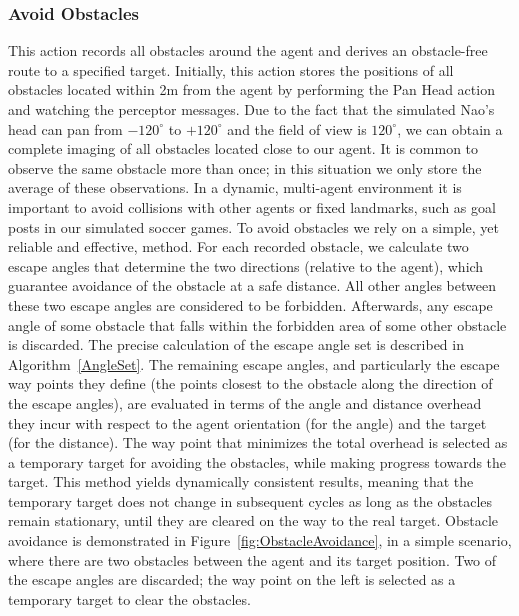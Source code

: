 \subsubsection*{Avoid Obstacles} 
This action records all obstacles around the agent and derives an obstacle-free route to a specified target. Initially, this action stores the positions of all obstacles located within 2m from the agent by performing the Pan Head action and watching the perceptor messages. Due to the fact that the simulated Nao's head can pan from $-120^{\circ}$ to $+120^{\circ}$ and the field of view is $120^{\circ}$, we can obtain a complete imaging of all obstacles located close to our agent. It is common to observe the same obstacle more than once; in this situation we only store the average of these observations. In a dynamic, multi-agent environment it is important to avoid collisions with other agents or fixed landmarks, such as goal posts in our simulated soccer games. To avoid obstacles we rely on a simple, yet reliable and effective, method. For each recorded obstacle, we calculate two escape angles that determine the two directions (relative to the agent), which guarantee avoidance of the obstacle at a safe distance. All other angles between these two escape angles are considered to be forbidden. Afterwards, any escape angle of some obstacle that falls within the forbidden area of some other obstacle is discarded.  The precise calculation of the escape angle set is described in Algorithm~\ref{AngleSet}. The remaining escape angles, and particularly the escape way points they define (the points closest to the obstacle along the direction of the escape angles), are evaluated in terms of the angle and distance overhead they incur with respect to the agent orientation (for the angle) and the target (for the distance). The way point that minimizes the total overhead is selected as a temporary target for avoiding the obstacles, while making progress towards the target. This method yields dynamically consistent results, meaning that the temporary target does not change in subsequent cycles as long as the obstacles remain stationary, until they are cleared on the way to the real target. Obstacle avoidance is demonstrated in Figure~\ref{fig:ObstacleAvoidance}, in a simple scenario, where there are two obstacles between the agent and its target position. Two of the escape angles are discarded; the way point on the left is selected as a temporary target to clear the obstacles. 
 

